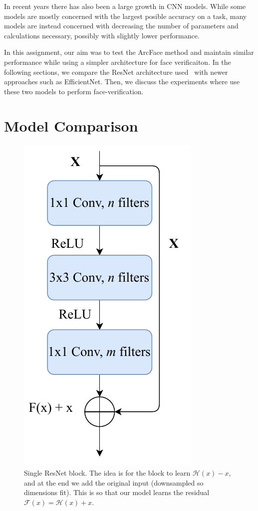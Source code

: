 \documentclass[conference]{IEEEtran}
\begin{document}
In recent years there has also been a large growth in CNN models.
While some models are mostly concerned with the largest posible accuracy on a task,
many models are instead concerned with decreasing the number of parameters
and calculations necessary, possibly with slightly lower performance.

In this assignment, our aim was to test the ArcFace method and maintain 
similar performance while using a simpler architecture for face verificaiton.
In the following sections, we compare the ResNet architecture used~\cite{Deng_2019_CVPR}
with newer approaches such as EfficientNet.
Then, we discuss the experiments where use these two models to perform
face-verification.

\section{Model Comparison}
\begin{figure}[!t]
	\centering
	\includegraphics[scale=0.5]{resnet-block}
	\caption{Single ResNet block. The idea is for the block to learn 
	$\mathcal{H}(x)-x$, and at the end we add the original input (downsampled 
	so dimensions fit). 
	This is so that our model learns the residual $\mathcal{F}(x) = \mathcal{H}(x) + x$.}
	\label{fig:resnetblock}
\end{figure}
\end{document}
